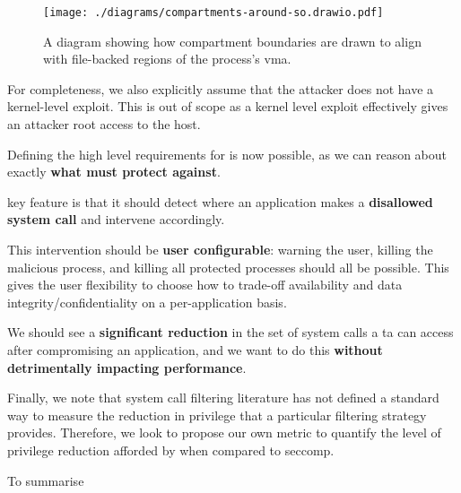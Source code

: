 \begin{figure}[ht]
    \centering
    \texttt{[image: ./diagrams/compartments-around-so.drawio.pdf]} 
    \caption{A diagram showing how compartment boundaries are drawn to align
    with file-backed regions of the process's \ac{vma}.}
    \label{fig:compartments-around-vma}
\end{figure}

For completeness, we also explicitly assume that the attacker does not have a
kernel-level exploit. This is out of scope as a kernel level exploit effectively
gives an attacker root access to the host.

Defining the high level requirements for \af is now possible, as we can reason
about exactly \textbf{what \af must protect against}.


\afg key feature is that it should detect where an application makes a 
\textbf{disallowed system call} and intervene accordingly. 

This intervention should be \textbf{user configurable}: warning the user, killing 
the malicious process, and killing all protected processes should all be
possible. This gives the user flexibility to choose how to trade-off
availability and data integrity/confidentiality on a per-application basis.

We should see a \textbf{significant reduction} in the set of system calls a \ac{ta}
can access after compromising an application, and we want to do this
\textbf{without detrimentally impacting performance}.

Finally, we note that system call filtering literature has not defined a standard
way to measure the reduction in privilege that a particular filtering
strategy provides. Therefore, we look to propose our own metric to quantify
the level of privilege reduction afforded by \af when compared to seccomp.

To summarise 

